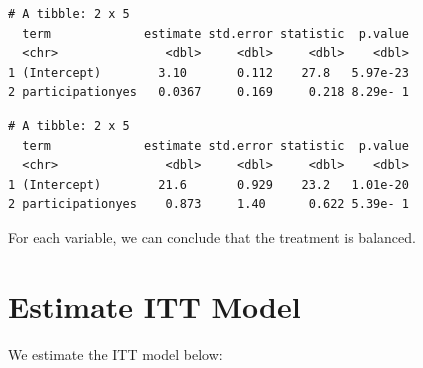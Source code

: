 \documentclass[]{book}
\newenvironment{Shaded}{\begin{snugshade}}{\end{snugshade}}
\newcommand{\KeywordTok}[1]{\textcolor[rgb]{0.13,0.29,0.53}{\textbf{#1}}}
\newcommand{\NormalTok}[1]{#1}
\newcommand{\OperatorTok}[1]{\textcolor[rgb]{0.81,0.36,0.00}{\textbf{#1}}}
\newcommand{\StringTok}[1]{\textcolor[rgb]{0.31,0.60,0.02}{#1}}
\begin{document}
\begin{Shaded}
\end{Shaded}

\begin{verbatim}
# A tibble: 2 x 5
  term             estimate std.error statistic  p.value
  <chr>               <dbl>     <dbl>     <dbl>    <dbl>
1 (Intercept)        3.10       0.112    27.8   5.97e-23
2 participationyes   0.0367     0.169     0.218 8.29e- 1
\end{verbatim}

\begin{Shaded}
\end{Shaded}

\begin{verbatim}
# A tibble: 2 x 5
  term             estimate std.error statistic  p.value
  <chr>               <dbl>     <dbl>     <dbl>    <dbl>
1 (Intercept)        21.6       0.929    23.2   1.01e-20
2 participationyes    0.873     1.40      0.622 5.39e- 1
\end{verbatim}

For each variable, we can conclude that the treatment is balanced.

\hypertarget{estimate-itt-model}{%
\section{Estimate ITT Model}\label{estimate-itt-model}}

We estimate the ITT model below:

\begin{Shaded}
\end{Shaded}
\end{document}
